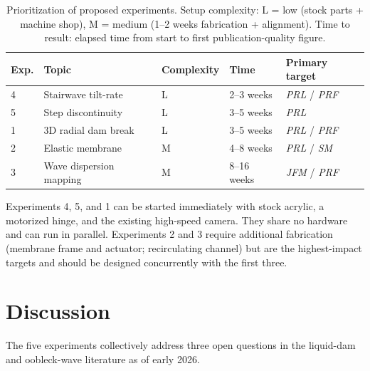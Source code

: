 \documentclass[aps,preprint,superscriptaddress,longbibliography]{revtex4-2}
\begin{document}
\begin{table}[h]
\caption{\label{tab:priority}
Prioritization of proposed experiments.
Setup complexity: L = low (stock parts + machine shop),
M = medium (1--2 weeks fabrication + alignment).
Time to result: elapsed time from start to first publication-quality figure.}
\begin{ruledtabular}
\begin{tabular}{lllll}
Exp. & Topic & Complexity & Time & Primary target \\
\hline
4 & Stairwave tilt-rate     & L   & 2--3 weeks  & \textit{PRL} / \textit{PRF} \\
5 & Step discontinuity      & L   & 3--5 weeks  & \textit{PRL}               \\
1 & 3D radial dam break     & L   & 3--5 weeks  & \textit{PRL} / \textit{PRF} \\
2 & Elastic membrane        & M   & 4--8 weeks  & \textit{PRL} / \textit{SM}  \\
3 & Wave dispersion mapping & M   & 8--16 weeks & \textit{JFM} / \textit{PRF} \\
\end{tabular}
\end{ruledtabular}
\end{table}

Experiments 4, 5, and 1 can be started immediately with stock acrylic,
a motorized hinge, and the existing high-speed camera.  They share no hardware
and can run in parallel.  Experiments 2 and 3 require additional fabrication
(membrane frame and actuator; recirculating channel) but are the highest-impact
targets and should be designed concurrently with the first three.

\section{Discussion}
\label{sec:discussion}

The five experiments collectively address three open questions in the
liquid-dam and oobleck-wave literature as of early 2026.
\end{document}

